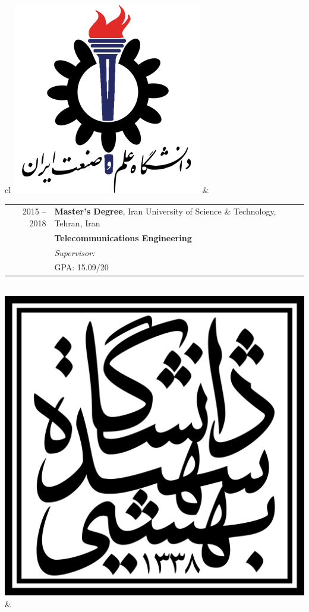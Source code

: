 
\begin{tabular}{cl}
	\includegraphics[scale=0.12]{graphics/IUST_logo_color} & 
	\begin{tabular}{rl}
		\textsc{2015 --2018} & \textbf{Master’s Degree},  Iran University of Science \& Technology,  Tehran, Iran                            \\
		                     & \textbf{Telecommunications Engineering}                                                                       \\
		                     & \emph{Supervisor: \link{http://www.iust.ac.ir/content/45110/Dr.-Haddadi}{Assistant Professor Farzan Haddadi}} \\
		                     & \textsc{GPA}: 15.09/20                                                                                        \\
	\end{tabular}
	\\
	\includegraphics[scale=0.05]{graphics/SBU_logo}        & 

\end{tabular}
